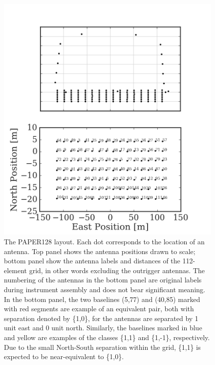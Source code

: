 \documentclass[twocolumn,apj,numberedappendix]{emulateapj}
\renewcommand\[{\begin{equation}}
\renewcommand\]{\end{equation}}
\begin{document}
\begin{figure}[H]
\includegraphics[width=\linewidth]{antpos128}

\caption{The PAPER128 layout. Each dot corresponds to the location of
an antenna. Top panel shows the antenna positions drawn to scale;
bottom panel show the antenna labels and distances of the 112-element grid, in other words excluding the outrigger antennas.
The numbering of the antennas in the bottom panel are original labels
during instrument assembly and does not bear significant
meaning. In the bottom panel, the two baselines (5,77) and (40,85) marked with red segments are example of an equivalent pair, both with separation denoted by \{1,0\}, for the
antennas are separated by 1 unit east and 0 unit north. Similarly,
the baselines marked in blue and yellow are examples
of the classes \{1,1\} and \{1,-1\}, respectively. Due to the small North-South separation within the grid, \{1,1\} is expected to be near-equivalent to \{1,0\}. }
\label{fig:AntPos}
\end{figure}
\end{document}
